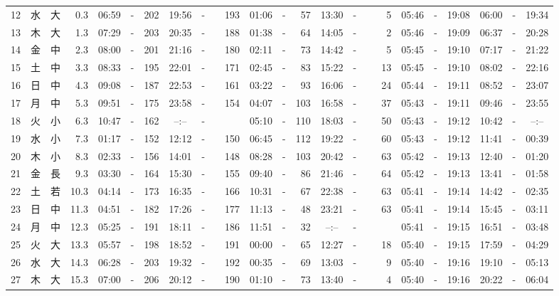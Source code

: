 \documentclass[12pt,a4j]{jsarticle}
\begin{document}
\begin{table}[htbp]
\begin{center}
{\begin{tabular}{|rc|cr|ccrccr|ccrccr|ccc|ccc|}
12 & 水 & 大 &  0.3 &  06:59 &-& 202 &  19:56 &-& 193 &  01:06 &-&  57 &  13:30 &-&   5 & 05:46 & -& 19:08 & 06:00 & -& 19:34 \\
13 & 木 & 大 &  1.3 &  07:29 &-& 203 &  20:35 &-& 188 &  01:38 &-&  64 &  14:05 &-&   2 & 05:46 & -& 19:09 & 06:37 & -& 20:28 \\
14 & 金 & 中 &  2.3 &  08:00 &-& 201 &  21:16 &-& 180 &  02:11 &-&  73 &  14:42 &-&   5 & 05:45 & -& 19:10 & 07:17 & -& 21:22 \\
15 & 土 & 中 &  3.3 &  08:33 &-& 195 &  22:01 &-& 171 &  02:45 &-&  83 &  15:22 &-&  13 & 05:45 & -& 19:10 & 08:02 & -& 22:16 \\
16 & 日 & 中 &  4.3 &  09:08 &-& 187 &  22:53 &-& 161 &  03:22 &-&  93 &  16:06 &-&  24 & 05:44 & -& 19:11 & 08:52 & -& 23:07 \\
17 & 月 & 中 &  5.3 &  09:51 &-& 175 &  23:58 &-& 154 &  04:07 &-& 103 &  16:58 &-&  37 & 05:43 & -& 19:11 & 09:46 & -& 23:55 \\
18 & 火 & 小 &  6.3 &  10:47 &-& 162 &  --:-- &-&~~~~~ &  05:10 &-& 110 &  18:03 &-&  50 & 05:43 & -& 19:12 & 10:42 & -& --:-- \\
19 & 水 & 小 &  7.3 &  01:17 &-& 152 &  12:12 &-& 150 &  06:45 &-& 112 &  19:22 &-&  60 & 05:43 & -& 19:12 & 11:41 & -& 00:39 \\
20 & 木 & 小 &  8.3 &  02:33 &-& 156 &  14:01 &-& 148 &  08:28 &-& 103 &  20:42 &-&  63 & 05:42 & -& 19:13 & 12:40 & -& 01:20 \\
21 & 金 & 長 &  9.3 &  03:30 &-& 164 &  15:30 &-& 155 &  09:40 &-&  86 &  21:46 &-&  64 & 05:42 & -& 19:13 & 13:41 & -& 01:58 \\
22 & 土 & 若 & 10.3 &  04:14 &-& 173 &  16:35 &-& 166 &  10:31 &-&  67 &  22:38 &-&  63 & 05:41 & -& 19:14 & 14:42 & -& 02:35 \\
23 & 日 & 中 & 11.3 &  04:51 &-& 182 &  17:26 &-& 177 &  11:13 &-&  48 &  23:21 &-&  63 & 05:41 & -& 19:14 & 15:45 & -& 03:11 \\
24 & 月 & 中 & 12.3 &  05:25 &-& 191 &  18:11 &-& 186 &  11:51 &-&  32 &  --:-- &-&~~~~~ & 05:41 & -& 19:15 & 16:51 & -& 03:48 \\
25 & 火 & 大 & 13.3 &  05:57 &-& 198 &  18:52 &-& 191 &  00:00 &-&  65 &  12:27 &-&  18 & 05:40 & -& 19:15 & 17:59 & -& 04:29 \\
26 & 水 & 大 & 14.3 &  06:28 &-& 203 &  19:32 &-& 192 &  00:35 &-&  69 &  13:03 &-&   9 & 05:40 & -& 19:16 & 19:10 & -& 05:13 \\
27 & 木 & 大 & 15.3 &  07:00 &-& 206 &  20:12 &-& 190 &  01:10 &-&  73 &  13:40 &-&   4 & 05:40 & -& 19:16 & 20:22 & -& 06:04 \\

\end{tabular}}
\end{center}
\end{table}
\end{document}
